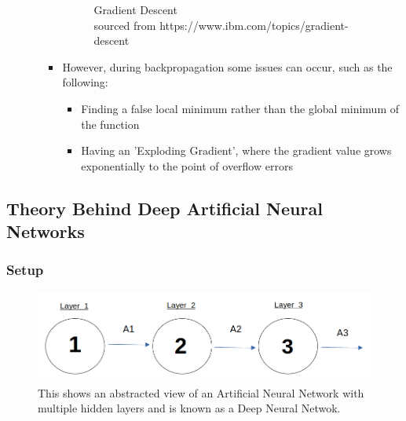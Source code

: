 \documentclass[./project-report/src/latex/project-report.tex]{subfiles}
\begin{document}
\begin{itemize}
\begin{itemize}
\begin{itemize}
\begin{figure}[h!]
                \caption{Gradient Descent\\
                        sourced from https://www.ibm.com/topics/gradient-descent}
                \end{figure}
            \item However, during backpropagation some issues can occur, such as the following:
            \begin{itemize}
                \item Finding a false local minimum rather than the global minimum of the function
                \item Having an 'Exploding Gradient', where the gradient value grows exponentially to the point of overflow errors
            \end{itemize}
        \end{itemize}
    \end{itemize}
\end{itemize}

\vspace{5mm}
\subsection{Theory Behind Deep Artificial Neural Networks}
\vspace{5mm}

\subsubsection{Setup}

\begin{figure}[h!]
\centering
\includegraphics[width=1\textwidth]{./project-report/src/images/deep-ann-diagram.png}
\caption{This shows an abstracted view of an Artificial Neural Network with multiple hidden layers and is known as a Deep Neural Netwok.}
\end{figure}
\end{document}
